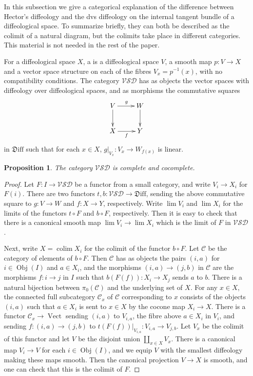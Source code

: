 \documentclass{amsart}
\newcommand{\dfn}[1]{\textbf{\boldmath{#1}}}
\newtheorem{prop}[de]{Proposition}
\theoremstyle{remark}
\DeclareMathOperator*{\colim}{colim}
\newcommand{\ra}{\to}
\DeclareMathOperator{\obj}{Obj}
\DeclareMathOperator{\Vect}{Vect}
\newcommand{\Diff}{{\mathfrak{D}\mathrm{iff}}}
\newcommand{\cC}{{\mathcal{C}}}
\newcommand{\VSD}{{\mathcal{VSD}}}
\begin{document}
In this subsection we give a categorical explanation of the difference between Hector's diffeology
and the dvs diffeology on the internal tangent bundle of a diffeological space.
To summarize briefly, they can both be described as the colimit of a natural diagram,
but the colimits take place in different categories.
This material is not needed in the rest of the paper.

\medskip

For a diffeological space $X$,
a \dfn{vector space with diffeology over $X$}
is a diffeological space $V$, a smooth map $p:V \ra X$
and a vector space structure on each of the fibres $V_x = p^{-1}(x)$,
with no compatibility conditions.
The category $\VSD$ has as objects the vector spaces with diffeology
over diffeological spaces, and as morphisms the commutative squares
\[
\xymatrix{V \ar[r]^g \ar[d] & W \ar[d] \\ X \ar[r]_f & Y}
\]
in $\Diff$ such that
for each $x \in X$, $g|_{V_x}: V_x \ra W_{f(x)}$ is linear.

\begin{prop}
The category $\VSD$ is complete and cocomplete.
\end{prop}

\begin{proof}
Let $F: I \ra \VSD$ be a functor from a small category,
and write $V_i \ra X_i$ for $F(i)$.
There are two functors $t,b:\VSD \ra \Diff$,
sending the above commutative square to $g:V \ra W$ and $f:X \ra Y$, respectively.
Write $\lim V_i$ and $\lim X_i$ for the limits of the functors
$t \circ F$ and $b \circ F$, respectively.
Then it is easy to check that there is a canonical smooth map
$\lim V_i \ra \lim X_i$ which is the limit of $F$ in $\VSD$.

Next, write $X=\colim X_i$ for the colimit of the functor $b \circ F$.
Let $\cC$ be the category of elements of $b \circ F$.
Then $\cC$ has as objects the pairs $(i,a)$ for $i \in \obj(I)$ and $a \in X_i$,
and the morphisms $(i,a) \ra (j,b)$ in $\cC$ are the morphisms $f:i \ra j$ in $I$
such that $b(F(f)): X_i \ra X_j$ sends $a$ to $b$.
There is a natural bijection between $\pi_0(\cC)$ and the underlying set of $X$.
For any $x \in X$, the connected full subcategory $\cC_x$
of $\cC$ corresponding to $x$ consists of the objects $(i,a)$
such that $a \in X_i$ is sent to $x \in X$ by the cocone map $X_i \to X$.
There is a functor $\cC_x \ra \Vect$ sending $(i,a)$ to
$V_{i,a}$, the fibre above $a \in X_i$ in $V_i$, and
sending $f:(i,a) \ra (j,b)$ to $t(F(f))|_{V_{i,a}}:V_{i,a} \ra V_{j,b}$.
Let $V_x$ be the colimit of this functor
and let $V$ be the disjoint union $\coprod_{x \in X} V_x$.
There is a canonical map $V_i \ra V$ for each $i \in \obj(I)$,
and we equip $V$ with the smallest diffeology making these maps smooth.
Then the canonical projection $V \ra X$ is smooth,
and one can check that this is the colimit of $F$.
\end{proof}
\end{document}
